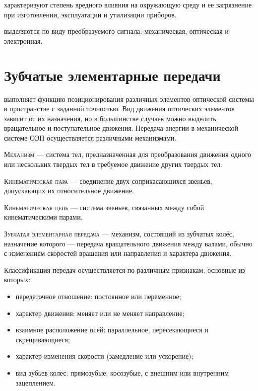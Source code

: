 \documentclass{tufte-book}
\begin{document}
 характеризуют степень вредного влияния на окружающую среду и ее загрязнение при изготовлении, эксплуатации и утилизации приборов.

 выделяются по виду преобразуемого сигнала: механическая, оптическая и электронная.

\chapter{Зубчатые элементарные передачи}
\label{ch:gears}

 выполняет функцию позиционирования различных элементов оптической системы в пространстве с заданной точностью.
Вид движения оптических элементов зависит от их назначения, но в большинстве случаев можно выделить вращательное и поступательное движения.
Передача энергии в механической системе ОЭП осуществляется различными механизмами.

\noindent
\textsc{Механизм} --- система тел, предназначенная для преобразования движения одного или нескольких твердых тел в требуемое движение других твердых тел.

\noindent
\textsc{Кинематическая пара} --- соединение двух соприкасающихся звеньев, допускающих их относительное движение.

\noindent
\textsc{Кинематическая цепь} --- система звеньев, связанных между собой кинематическими парами.

\noindent
\textsc{Зубчатая элементарная передача} --- механизм, состоящий из зубчатых колёс, назначение которого --- передача вращательного движения между валами, обычно с изменением скоростей вращения или направления и характера движения.

Классификация передач осуществляется по различным признакам, основные из которых:
\begin{itemize}
	\item передаточное отношение: постоянное или переменное;
	\item характер движения: меняет или не меняет направление;
	\item взаимное расположение осей: параллельное, пересекающиеся и скрещивающиеся;
	\item характер изменения скорости (замедление или ускорение);
	\item вид зубьев колес: прямозубые, косозубые, с внешним или внутренним зацеплением.
\end{itemize}
\end{document}
